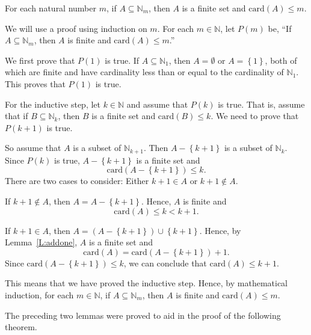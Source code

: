 %
\begin{lemma} \label{L:subsetsofNk}
For each natural number $m$, if $A \subseteq \mathbb{N}_m$, then $A$ is a finite set and 
$\text{card} \left( A \right) \leq m$.
\end{lemma}
%
\begin{myproof}
We will use a proof using induction on $m$.  For each $m \in \mathbb{N}$, let 
$P( m )$ be, ``If $A \subseteq \mathbb{N}_m$, then $A$ is finite and 
$\text{card}( A ) \leq m$.''

We first prove that $P( 1 )$ is true.  If $A \subseteq \mathbb{N}_1$, then 
$A = \emptyset$ or $A = \left\{ 1 \right\}$, both of which are finite and have cardinality less than or equal to the cardinality of $\mathbb{N}_1$.  This proves that $P( 1 )$ is true.

For the inductive step, let $k \in \mathbb{N}$ and assume that $P( k )$ is true.  That is, assume that if $B \subseteq \mathbb{N}_k$, then $B$ is a finite set and 
$\text{card}( B ) \leq k$.  We need to prove that 
$P( k+1 )$ is true.

So assume that $A$ is a subset of $\mathbb{N}_{k+1}$.  Then $A - \left\{ k+1 \right\}$ is a subset of $\mathbb{N}_k$.  Since $P( k )$ is true, $A - \left\{ k+1 \right\}$ is a finite set and 
\[
\text{card} \!\left( A - \left\{ k+1 \right\} \right) \leq k.
\]
There are two cases to consider:  Either $k+1 \in A$ or $k+1 \not \in A$.

\vskip6pt
If $k+1 \not \in A$, then $A = A - \left\{ k+1 \right\}$.  Hence, $A$ is finite and
\[
\text{card} ( A ) \leq k < k+1.
\]

If $k+1 \in A$, then $A = ( A - \left\{ k+1 \right\} ) \cup \left\{ k+1 \right\}$. Hence, by Lemma~\ref{L:addone}, $A$ is a finite set and
\[
\text{card} ( A ) = 
\text{card} \!\left(  A - \left\{ k+1 \right\}  \right) + 1.
\]
Since $\text{card} \!\left( A - \left\{ k+1 \right\} \right) \leq k$, we can conclude that 
$\text{card} ( A ) \leq k + 1$. 

This means that we have proved the inductive step.  Hence, by mathematical induction, for each 
$m \in \mathbb{N}$, if $A \subseteq \mathbb{N}_m$, then $A$ is finite and 
$\text{card} ( A ) \leq m$.
\end{myproof}
The preceding two lemmas were proved to aid in the proof of the following theorem.

